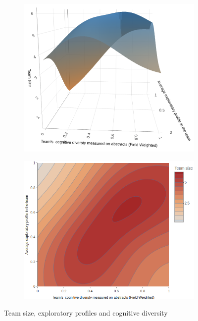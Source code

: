 \begin{figure}[H]
\centering
\begin{subfigure}{.52\textwidth}
  \centering
      \includegraphics[width=\textwidth]{2_chapter2/figures/intra_inter_aut.png}
\end{subfigure}%
\begin{subfigure}{.52\textwidth}
      \includegraphics[width=\textwidth]{2_chapter2/figures/intra_inter_aut_cont.png}
\end{subfigure}
\caption{Team size, exploratory profiles and cognitive diversity}
      \label{figure:team_3d}
\end{figure}


